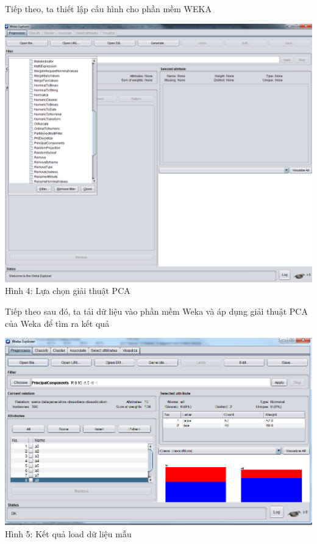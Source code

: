 \documentclass{hcmutarticle}
\begin{document}
Tiếp theo, ta thiết lập cấu hình cho phần mềm WEKA
\begin{center}
	\includegraphics[scale=0.4]{image/step1.png}\\[0.5cm]
	Hình 4: Lựa chọn giải thuật PCA 
\end{center}
Tiếp theo sau đó, ta tải dữ liệu vào phần mềm Weka và áp dụng giải thuật PCA của Weka để tìm ra kết quả
\begin{center}
	\includegraphics[scale=0.5]{image/pca_1.png}\\[0.5cm]
	Hình 5: Kết quả load dữ liệu mẫu
\end{center}
\end{document}

